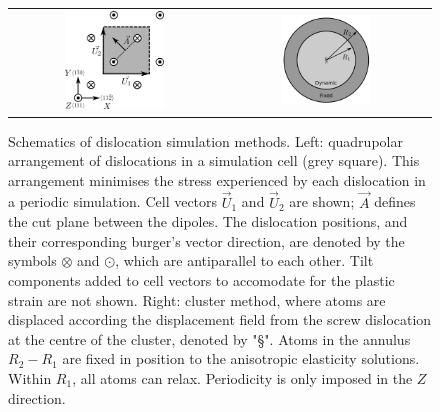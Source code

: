 \documentclass[a4paper,11pt]{article}
\begin{document}
        \begin{figure}
    \begin{tabular}{cc}
	     \includegraphics[width=0.5\textwidth]{Images/s_arrangement_quadrupole.png} &
             \includegraphics[width=0.45\textwidth]{Images/cluster_method_schematic.png}  \\
    \end{tabular}		
\caption{Schematics of dislocation simulation methods. Left: quadrupolar arrangement of dislocations in a simulation cell (grey square). This arrangement  minimises the stress experienced by each dislocation in a periodic simulation. Cell vectors $\vec{U}_1$ and $\vec{U}_2$ are shown; $\vec{A}$ defines the cut plane between the dipoles. The dislocation positions, and their corresponding burger's vector direction, are denoted by the symbols $\otimes$ and $\odot$, which are antiparallel to each other. Tilt components added to cell vectors to accomodate for the plastic strain are not shown. Right: cluster method, where atoms are displaced according the displacement field from the screw dislocation at the centre of the cluster, denoted by "\S". Atoms in the annulus $R_2 - R_1$ are fixed in position to the anisotropic elasticity solutions. Within $R_1$, all atoms can relax. Periodicity is only imposed in the $Z$ direction.}
	\label{fig:dislocationschematics}
    \end{figure}
\end{document}
